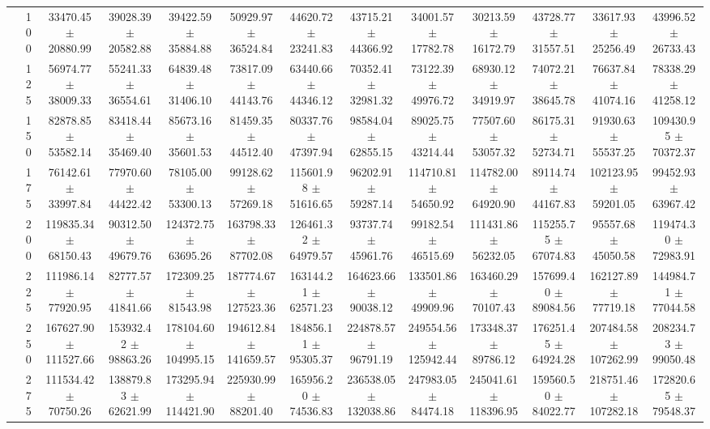 \begin{table}[h]
{\begin{tabular}{
        ccccccccccccc}
 & 100& 33470.45 $\pm$ 20880.99& 39028.39 $\pm$ 20582.88& 39422.59 $\pm$ 35884.88& 50929.97 $\pm$ 36524.84& 44620.72 $\pm$ 23241.83& 43715.21 $\pm$ 44366.92& 34001.57 $\pm$ 17782.78& 30213.59 $\pm$ 16172.79& 43728.77 $\pm$ 31557.51& 33617.93 $\pm$ 25256.49& 43996.52 $\pm$ 26733.43 \\ 
 & 125& 56974.77 $\pm$ 38009.33& 55241.33 $\pm$ 36554.61& 64839.48 $\pm$ 31406.10& 73817.09 $\pm$ 44143.76& 63440.66 $\pm$ 44346.12& 70352.41 $\pm$ 32981.32& 73122.39 $\pm$ 49976.72& 68930.12 $\pm$ 34919.97& 74072.21 $\pm$ 38645.78& 76637.84 $\pm$ 41074.16& 78338.29 $\pm$ 41258.12 \\ 
 & 150& 82878.85 $\pm$ 53582.14& 83418.44 $\pm$ 35469.40& 85673.16 $\pm$ 35601.53& 81459.35 $\pm$ 44512.40& 80337.76 $\pm$ 47397.94& 98584.04 $\pm$ 62855.15& 89025.75 $\pm$ 43214.44& 77507.60 $\pm$ 53057.32& 86175.31 $\pm$ 52734.71& 91930.63 $\pm$ 55537.25& 109430.95 $\pm$ 70372.37 \\ 
 & 175& 76142.61 $\pm$ 33997.84& 77970.60 $\pm$ 44422.42& 78105.00 $\pm$ 53300.13& 99128.62 $\pm$ 57269.18& 115601.98 $\pm$ 51616.65& 96202.91 $\pm$ 59287.14& 114710.81 $\pm$ 54650.92& 114782.00 $\pm$ 64920.90& 89114.74 $\pm$ 44167.83& 102123.95 $\pm$ 59201.05& 99452.93 $\pm$ 63967.42 \\ 
 & 200& 119835.34 $\pm$ 68150.43& 90312.50 $\pm$ 49679.76& 124372.75 $\pm$ 63695.26& 163798.33 $\pm$ 87702.08& 126461.32 $\pm$ 64979.57& 93737.74 $\pm$ 45961.76& 99182.54 $\pm$ 46515.69& 111431.86 $\pm$ 56232.05& 115255.75 $\pm$ 67074.83& 95557.68 $\pm$ 45050.58& 119474.30 $\pm$ 72983.91 \\ 
 & 225& 111986.14 $\pm$ 77920.95& 82777.57 $\pm$ 41841.66& 172309.25 $\pm$ 81543.98& 187774.67 $\pm$ 127523.36& 163144.21 $\pm$ 62571.23& 164623.66 $\pm$ 90038.12& 133501.86 $\pm$ 49909.96& 163460.29 $\pm$ 70107.43& 157699.40 $\pm$ 89084.56& 162127.89 $\pm$ 77719.18& 144984.71 $\pm$ 77044.58 \\ 
 & 250& 167627.90 $\pm$ 111527.66& 153932.42 $\pm$ 98863.26& 178104.60 $\pm$ 104995.15& 194612.84 $\pm$ 141659.57& 184856.11 $\pm$ 95305.37& 224878.57 $\pm$ 96791.19& 249554.56 $\pm$ 125942.44& 173348.37 $\pm$ 89786.12& 176251.45 $\pm$ 64924.28& 207484.58 $\pm$ 107262.99& 208234.73 $\pm$ 99050.48 \\ 
 & 275& 111534.42 $\pm$ 70750.26& 138879.83 $\pm$ 62621.99& 173295.94 $\pm$ 114421.90& 225930.99 $\pm$ 88201.40& 165956.20 $\pm$ 74536.83& 236538.05 $\pm$ 132038.86& 247983.05 $\pm$ 84474.18& 245041.61 $\pm$ 118396.95& 159560.50 $\pm$ 84022.77& 218751.46 $\pm$ 107282.18& 172820.65 $\pm$ 79548.37 \\ 

\end{tabular}}
\end{table}
